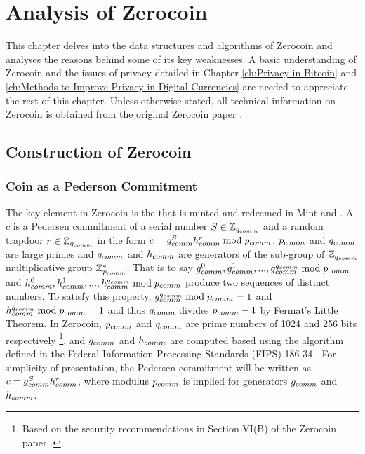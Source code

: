 \ifpdf
\graphicspath{{Chapter3/Figs/}}
\else
\graphicspath{{Chapter3/Figs/}}
\fi

\chapter{Analysis of Zerocoin}
\label{ch:Analysis of Zerocoin}
This chapter delves into the data structures and algorithms of Zerocoin and analyses the reasons behind some of its key weaknesses. A basic understanding of Zerocoin and the issues of privacy detailed in Chapter \ref{ch:Privacy in Bitcoin} and \ref{ch:Methods to Improve Privacy in Digital Currencies} are needed to appreciate the rest of this chapter. Unless otherwise stated, all technical information on Zerocoin is obtained from the original Zerocoin paper \cite{Miers2013}.

\section{Construction of Zerocoin}
\subsection{Coin as a Pederson Commitment}
\label{sec:3-Coin as a Pederson Commitment}
The key element in Zerocoin is the \kwCoin{} that is minted and redeemed in Mint and . A \kwCoin{} $c$ is a Pedersen commitment \cite{Pedersen1992} of a serial number $S\in\mathbb{Z}_{q_{comm}}$ and a random trapdoor $r\in\mathbb{Z}_{q_{comm}}$ in the form $c=g_{comm}^{S}h_{comm}^{r}\bmod{p_{comm}}$. $p_{comm}$ and $q_{comm}$ are large primes and $g_{comm}$ and $h_{comm}$ are generators of the sub-group of $\mathbb{Z}_{q_{comm}}$ multiplicative group $\mathbb{Z}_{p_{comm}}^{*}$. That is to say $g_{comm}^0,g_{comm}^1,...,g_{comm}^{q_{comm}}\bmod{p_{comm}}$ and $h_{comm}^0,h_{comm}^1,...,h_{comm}^{q_{comm}}\bmod{p_{comm}}$ produce two sequences of distinct numbers. To satisfy this property, $g_{comm}^{q_{comm}} \bmod{p_{comm}}=1$ and $h_{comm}^{q_{comm}} \bmod{p_{comm}}=1$ and thus $q_{comm}$ divides $p_{comm}-1$ by Fermat’s Little Theorem. In Zerocoin, $p_{comm}$ and $q_{comm}$ are prime numbers of 1024 and 256 bits respectively \footnote{Based on the security recommendations in Section VI(B) of the Zerocoin paper \cite{Miers2013}.}, and $g_{comm}$ and $h_{comm}$ are computed based using the algorithm defined in the Federal Information Processing Standards (FIPS) 186-34 \cite{InformationTechnologyLaboratory2009}. For simplicity of presentation, the Pedersen commitment will be written as $c=g_{comm}^{S}h_{comm}^{r}$, where modulus $p_{comm}$ is implied for generators $g_{comm}$ and $h_{comm}$. 

